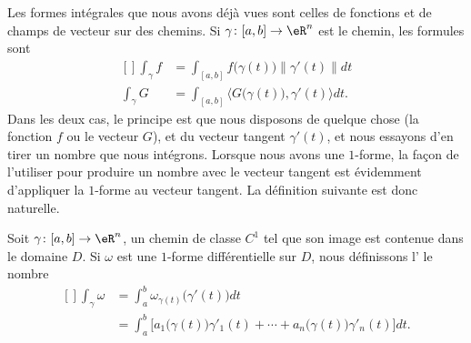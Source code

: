 Les formes intégrales que nous avons déjà vues sont celles de fonctions et de champs de vecteur sur des chemins. Si \( \gamma\colon [a,b]\to \eR^n\) est le chemin, les formules sont
\begin{equation}
	\begin{aligned}[]
		\int_{\gamma}f & =\int_{[a,b]}f\big( \gamma(t) \big)\| \gamma'(t) \|dt              \\
		\int_{\gamma}G & =\int_{[a,b]}\langle G\big( \gamma(t) \big), \gamma'(t)\rangle dt.
	\end{aligned}
\end{equation}
Dans les deux cas, le principe est que nous disposons de quelque chose (la fonction \( f\) ou le vecteur \( G\)), et du vecteur tangent \( \gamma'(t)\), et nous essayons d'en tirer un nombre que nous intégrons. Lorsque nous avons une \( 1\)-forme, la façon de l'utiliser pour produire un nombre avec le vecteur tangent est évidemment d'appliquer la \( 1\)-forme au vecteur tangent. La définition suivante est donc naturelle.

\begin{definition}
	Soit \( \gamma\colon [a,b]\to \eR^n\), un chemin de classe \( C^1\) tel que son image est contenue dans le domaine \( D\). Si \( \omega\) est une \( 1\)-forme différentielle sur \( D\), nous définissons l' le nombre
	\begin{equation}
		\begin{aligned}[]
			\int_{\gamma}\omega & =\int_a^b\omega_{\gamma(t)}\big( \gamma'(t) \big)dt                                                         \\
			                    & =\int_a^b\Big[ a_1\big( \gamma(t) \big)\gamma'_1(t)+\cdots +  a_n\big( \gamma(t) \big)\gamma'_n(t) \Big]dt.
		\end{aligned}
	\end{equation}
\end{definition}

